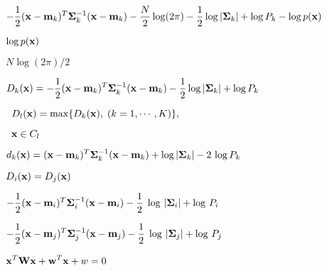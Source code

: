 \documentclass{article}
\def\lthtmlcheckvsize{\ifdim\ht\sizebox<\vsize 
  \ifdim\wd\sizebox<\hsize\expandafter\hfill\fi \expandafter\vfill
  \else\expandafter\vss\fi}%
\begin{document}
{\newpage\clearpage
{}%
$\displaystyle -\frac{1}{2}({\bf x}-{\bf m}_k)^T{\bf\Sigma}_k^{-1}({\bf x}-{\bf m}_k)
-\frac{N}{2}\log(2\pi)-\frac{1}{2}\log|{\bf\Sigma}_k|
+\log P_k-\log p({\bf x})$%
\lthtmlindisplaymathZ
\lthtmlcheckvsize\clearpage}

{\newpage\clearpage
{}%
$ \log p({\bf x})$%
\lthtmlindisplaymathZ
\lthtmlcheckvsize\clearpage}

{\newpage\clearpage
{}%
$ N \log(2\pi)/2$%
\lthtmlindisplaymathZ
\lthtmlcheckvsize\clearpage}

{\newpage\clearpage
{}%
$\displaystyle D_k({\bf x})=-\frac{1}{2}({\bf x}-{\bf m}_k)^T{\bf\Sigma}_k^{-1}({\bf x}-{\bf m}_k)
-\frac{1}{2}\log|{\bf\Sigma}_k|+\log P_k$%
\lthtmlindisplaymathZ
\lthtmlcheckvsize\clearpage}

{\newpage\clearpage
{}%
$\displaystyle \;\; D_l({\bf x})=\max \{ D_k({\bf x}),\;(k=1,\cdots,K)\},
\;\;\;\;\;$%
\lthtmlindisplaymathZ
\lthtmlcheckvsize\clearpage}

{\newpage\clearpage
{}%
$\displaystyle \;\;{\bf x}\in C_l$%
\lthtmlindisplaymathZ
\lthtmlcheckvsize\clearpage}

{\newpage\clearpage
{}%
$\displaystyle d_k({\bf x})=({\bf x}-{\bf m}_k)^T{\bf\Sigma}_k^{-1}({\bf x}-{\bf m}_k)
+\log|{\bf\Sigma}_k|-2\,\log P_k$%
\lthtmlindisplaymathZ
\lthtmlcheckvsize\clearpage}

{\newpage\clearpage
{}%
$ D_i({\bf x})=D_j({\bf x})$%
\lthtmlindisplaymathZ
\lthtmlcheckvsize\clearpage}

{\newpage\clearpage
{}%
$\displaystyle -\frac{1}{2}({\bf x}-{\bf m}_i)^T{\bf\Sigma}_i^{-1}({\bf x}-{\bf m}_i)
-\frac{1}{2}\;\log\,|{\bf\Sigma}_i | + \log\, P_i$%
\lthtmlindisplaymathZ
\lthtmlcheckvsize\clearpage}

{\newpage\clearpage
{}%
$\displaystyle -\frac{1}{2}({\bf x}-{\bf m}_j)^T{\bf\Sigma}_j^{-1}({\bf x}-{\bf m}_j)
-\frac{1}{2}\;\log\,|{\bf\Sigma}_j | + \log\, P_j$%
\lthtmlindisplaymathZ
\lthtmlcheckvsize\clearpage}

{\newpage\clearpage
{}%
$\displaystyle {\bf x}^T{\bf W}{\bf x}+{\bf w}^T{\bf x}+w=0$%
\lthtmlindisplaymathZ
\lthtmlcheckvsize\clearpage}
\end{document}
